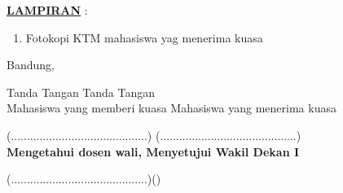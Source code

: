 \documentclass[12pt]{letter}
\begin{document}
{\textbf{\underline{LAMPIRAN}} :
\begin{enumerate}
	\item Fotokopi KTM mahasiswa yag menerima kuasa
\end{enumerate}

		\begin{flushright}
			Bandung, 
		\end{flushright}
Tanda Tangan \hspace{7.3cm}Tanda Tangan \\
Mahasiswa yang memberi kuasa \hspace{4cm} Mahasiswa yang menerima kuasa \\
\begin{flushright}
		\end{flushright}
			\vspace{1cm}

	(...........................................)\hspace{4.6cm} (...........................................)\\

	\textbf{Mengetahui dosen wali, \hspace{4.8cm} Menyetujui Wakil Dekan I}
	\vspace{2cm}

	(...........................................)\hspace{4.8cm}()
	\thispagestyle{empty}
		\newpage

}
\end{document}
